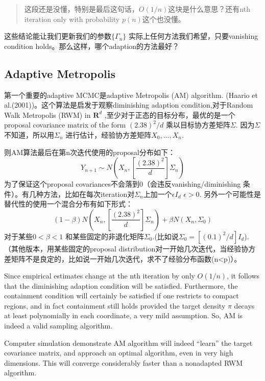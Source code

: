 \documentclass[
]{book}
\theoremstyle{definition}
\theoremstyle{definition}
\theoremstyle{definition}
\theoremstyle{remark}
\begin{document}
\begin{quote}
这段还是没懂，特别是最后这句话，\(O(1/n)\)这块是什么意思？还有nth iteration only with probability \(p(n)\)这个也没懂。
\end{quote}

这些结论能让我们更新我们的参数\(\{\Gamma_n\}\) 实际上任何方法我们希望，只要vanishing condition holds。那么这样，哪个adaption的方法最好？

\hypertarget{adaptive-metropolis}{%
\subsection{Adaptive Metropolis}\label{adaptive-metropolis}}

第一个重要的adaptive MCMC是adaptive Metropolis (AM) algorithm. (Haario et al.(2001))。这个算法是启发于观察diminishing adaption condition,对于Random Walk Metropolis (RWM) in \(\mathbf R^d\) ,至少对于正态的目标分布，最优的是一个proposal covariance matrix of the form \((2.38)^2/d\) 乘以目标协方差矩阵\(\Sigma\). 因为\(\Sigma\) 不知道，所以用\(\Sigma_n\) 进行估计，经验协方差矩阵\(X_0,...,X_n\).

则AM算法最后在第n次迭代使用的proposal分布如下：
\[
Y_{n+1} \sim N\left(X_{n},\left[\frac{(2.38)^{2}}{d}\right] \Sigma_{n}\right)
\]
为了保证这个proposal covariances不会落到0（会违反vanishing/diminishing 条件）。有几种方法，比如在每次iteration对\(\Sigma_n\)上加一个\(\epsilon I_d\) \(\epsilon>0\). 另外一个可能性是替代性的使用一个混合分布有如下形式：
\[
(1-\beta) N\left(X_{n},\left[\frac{(2.38)^{2}}{d}\right] \Sigma_{n}\right)+\beta N\left(X_{n}, \Sigma_{0}\right)
\]
对于某些\(0<\beta<1\) 和某些固定的非退化矩阵\(\Sigma_0\).(比如说\(\Sigma_{0}=\left[(0.1)^{2} / d\right] I_{d}\)). （其他版本，用某些固定的proposal distribution对一开始几次迭代，当经验协方差矩阵不是良定的，比如说一开始几次迭代，求不了经验分布函数(n\textless p)）。

Since empirical estimates change at the nth iteration by only \(O(1/n)\), it follows that the diminishing adaption condition will be satisfied. Furthermore, the containment condition will certainly be satisfied if one restricts to compact regions, and in fact containment still holds provided the target density \(\pi\) decays at least polynomially in each coordinate, a very mild assumption. So, AM is indeed a valid sampling algorithm.

Computer simulation demonstrate AM algorithm will indeed ``learn'' the target covariance matrix, and approach an optimal algorithm, even in very high dimensions. This will converge considerably faster than a nonadapted RWM algorithm.
\end{document}
